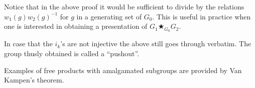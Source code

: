 \documentclass[12pt]{article}
\theoremstyle{definition}
\theoremstyle{remark}
\numberwithin{equation}{subsection}
\begin{document}
Notice that in the above proof it would be sufficient to divide by the relations 
$w_1(g)w_2(g)^{-1}$ for $g$ in a generating set of $G_0$. This
is useful in practice when one is interested in obtaining a presentation of 
$G_1\bigstar_{G_0} G_2$.

In case that the  $i_k$'s are not injective the above still goes through
verbatim. The group thusly obtained is called a ``pushout''.

Examples of free products with amalgamated subgroups are provided by Van
Kampen's theorem.
\end{document}
